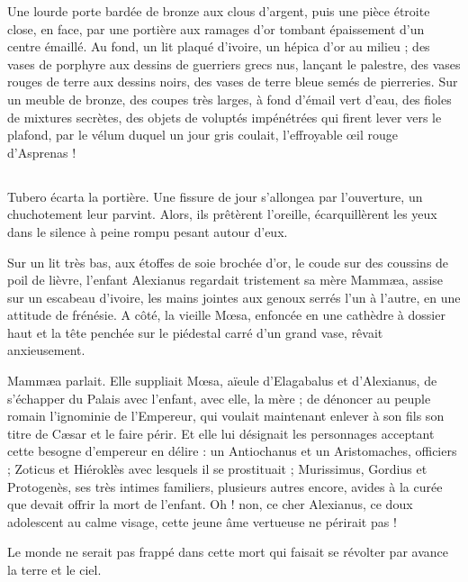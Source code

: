 \documentclass[a4paper, 11pt, oneside, polutonikogreek, french]{article}
\begin{document}
Une lourde porte bardée de bronze aux clous d'argent, puis une pièce étroite close, en face, par une portière aux ramages d'or tombant épaissement d'un centre émaillé. Au fond, un lit plaqué d'ivoire, un hépica d'or au milieu ; des vases de porphyre aux dessins de guerriers grecs nus, lançant le palestre, des vases rouges de terre aux dessins noirs, des vases de terre bleue semés de pierreries. Sur un meuble de bronze, des coupes très larges, à fond d'émail vert d'eau, des fioles de mixtures secrètes, des objets de voluptés impénétrées qui firent lever vers le plafond, par le vélum duquel un jour gris coulait, l'effroyable œil rouge d'Asprenas !
\clearpage
\subsection{}
\paragraph{}
Tubero écarta la portière. Une fissure de jour s'allongea par l'ouverture, un chuchotement leur parvint. Alors, ils prêtèrent l'oreille, écarquillèrent les yeux dans le silence à peine rompu pesant autour d'eux.

Sur un lit très bas, aux étoffes de soie brochée d'or, le coude sur des coussins de poil de lièvre, l'enfant Alexianus regardait tristement sa mère Mammæa, assise sur un escabeau d'ivoire, les mains jointes aux genoux serrés l'un à l'autre, en une attitude de frénésie. A côté, la vieille Mœsa, enfoncée en une cathèdre à dossier haut et la tête penchée sur le piédestal carré d'un grand vase, rêvait anxieusement.

Mammæa parlait. Elle suppliait Mœsa, aïeule d'Elagabalus et d'Alexianus, de s'échapper du Palais avec l'enfant, avec elle, la mère ; de dénoncer au peuple romain l'ignominie de l'Empereur, qui voulait maintenant enlever à son fils son titre de Cæsar et le faire périr. Et elle lui désignait les personnages acceptant cette besogne d'empereur en délire : un Antiochanus et un Aristomaches, officiers ; Zoticus et Hiéroklès avec lesquels il se prostituait ; Murissimus, Gordius et Protogenès, ses très intimes familiers, plusieurs autres encore, avides à la curée que devait offrir la mort de l'enfant. Oh ! non, ce cher Alexianus, ce doux adolescent au calme visage, cette jeune âme vertueuse ne périrait pas !

Le monde ne serait pas frappé dans cette mort qui faisait se révolter par avance la terre et le ciel.
\end{document}
